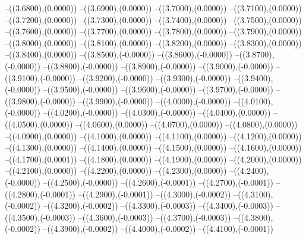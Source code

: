 {	--({\sx*(3.6800)},{\sy*(0.0000)})
	--({\sx*(3.6900)},{\sy*(0.0000)})
	--({\sx*(3.7000)},{\sy*(0.0000)})
	--({\sx*(3.7100)},{\sy*(0.0000)})
	--({\sx*(3.7200)},{\sy*(0.0000)})
	--({\sx*(3.7300)},{\sy*(0.0000)})
	--({\sx*(3.7400)},{\sy*(0.0000)})
	--({\sx*(3.7500)},{\sy*(0.0000)})
	--({\sx*(3.7600)},{\sy*(0.0000)})
	--({\sx*(3.7700)},{\sy*(0.0000)})
	--({\sx*(3.7800)},{\sy*(0.0000)})
	--({\sx*(3.7900)},{\sy*(0.0000)})
	--({\sx*(3.8000)},{\sy*(0.0000)})
	--({\sx*(3.8100)},{\sy*(0.0000)})
	--({\sx*(3.8200)},{\sy*(0.0000)})
	--({\sx*(3.8300)},{\sy*(0.0000)})
	--({\sx*(3.8400)},{\sy*(0.0000)})
	--({\sx*(3.8500)},{\sy*(-0.0000)})
	--({\sx*(3.8600)},{\sy*(-0.0000)})
	--({\sx*(3.8700)},{\sy*(-0.0000)})
	--({\sx*(3.8800)},{\sy*(-0.0000)})
	--({\sx*(3.8900)},{\sy*(-0.0000)})
	--({\sx*(3.9000)},{\sy*(-0.0000)})
	--({\sx*(3.9100)},{\sy*(-0.0000)})
	--({\sx*(3.9200)},{\sy*(-0.0000)})
	--({\sx*(3.9300)},{\sy*(-0.0000)})
	--({\sx*(3.9400)},{\sy*(-0.0000)})
	--({\sx*(3.9500)},{\sy*(-0.0000)})
	--({\sx*(3.9600)},{\sy*(-0.0000)})
	--({\sx*(3.9700)},{\sy*(-0.0000)})
	--({\sx*(3.9800)},{\sy*(-0.0000)})
	--({\sx*(3.9900)},{\sy*(-0.0000)})
	--({\sx*(4.0000)},{\sy*(-0.0000)})
	--({\sx*(4.0100)},{\sy*(-0.0000)})
	--({\sx*(4.0200)},{\sy*(-0.0000)})
	--({\sx*(4.0300)},{\sy*(-0.0000)})
	--({\sx*(4.0400)},{\sy*(0.0000)})
	--({\sx*(4.0500)},{\sy*(0.0000)})
	--({\sx*(4.0600)},{\sy*(0.0000)})
	--({\sx*(4.0700)},{\sy*(0.0000)})
	--({\sx*(4.0800)},{\sy*(0.0000)})
	--({\sx*(4.0900)},{\sy*(0.0000)})
	--({\sx*(4.1000)},{\sy*(0.0000)})
	--({\sx*(4.1100)},{\sy*(0.0000)})
	--({\sx*(4.1200)},{\sy*(0.0000)})
	--({\sx*(4.1300)},{\sy*(0.0000)})
	--({\sx*(4.1400)},{\sy*(0.0000)})
	--({\sx*(4.1500)},{\sy*(0.0000)})
	--({\sx*(4.1600)},{\sy*(0.0000)})
	--({\sx*(4.1700)},{\sy*(0.0001)})
	--({\sx*(4.1800)},{\sy*(0.0000)})
	--({\sx*(4.1900)},{\sy*(0.0000)})
	--({\sx*(4.2000)},{\sy*(0.0000)})
	--({\sx*(4.2100)},{\sy*(0.0000)})
	--({\sx*(4.2200)},{\sy*(0.0000)})
	--({\sx*(4.2300)},{\sy*(0.0000)})
	--({\sx*(4.2400)},{\sy*(-0.0000)})
	--({\sx*(4.2500)},{\sy*(-0.0000)})
	--({\sx*(4.2600)},{\sy*(-0.0001)})
	--({\sx*(4.2700)},{\sy*(-0.0001)})
	--({\sx*(4.2800)},{\sy*(-0.0001)})
	--({\sx*(4.2900)},{\sy*(-0.0001)})
	--({\sx*(4.3000)},{\sy*(-0.0002)})
	--({\sx*(4.3100)},{\sy*(-0.0002)})
	--({\sx*(4.3200)},{\sy*(-0.0002)})
	--({\sx*(4.3300)},{\sy*(-0.0003)})
	--({\sx*(4.3400)},{\sy*(-0.0003)})
	--({\sx*(4.3500)},{\sy*(-0.0003)})
	--({\sx*(4.3600)},{\sy*(-0.0003)})
	--({\sx*(4.3700)},{\sy*(-0.0003)})
	--({\sx*(4.3800)},{\sy*(-0.0002)})
	--({\sx*(4.3900)},{\sy*(-0.0002)})
	--({\sx*(4.4000)},{\sy*(-0.0002)})
	--({\sx*(4.4100)},{\sy*(-0.0001)})
}
